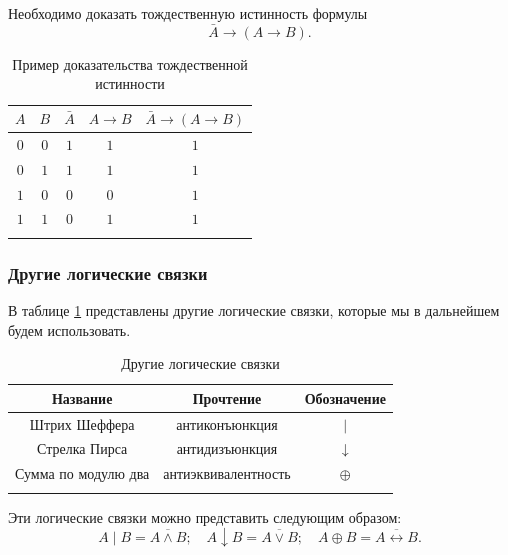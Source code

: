 \begin{example*}
    Необходимо доказать тождественную истинность формулы
    \[
        \bar{A} \to (A \to B).
    \]

    {
    \renewcommand*{\arraystretch}{1.5}
    \begin{longtable}{|c|c|c|c|c|}
        \hline
        \(A\) & \(B\) & \(\bar{A}\) & \(A \to B\) & \(\bar{A} \to (A \to B)\) \\
        \hline
        \(0\) & \(0\) & \(1\)       & \(1\)       & \(1\)                     \\
        \hline
        \(0\) & \(1\) & \(1\)       & \(1\)       & \(1\)                     \\
        \hline
        \(1\) & \(0\) & \(0\)       & \(0\)       & \(1\)                     \\
        \hline
        \(1\) & \(1\) & \(0\)       & \(1\)       & \(1\)                     \\
        \hline
        \caption{Пример доказательства тождественной истинности}
    \end{longtable}
    }
\end{example*}

\subsubsection{Другие логические связки}

В таблице \ref{tab:other-logical-connectives} представлены другие логические связки, которые мы в дальнейшем будем использовать.

{
\renewcommand*{\arraystretch}{1.5}
\begin{longtable}{|c|c|c|}
    \hline
    \textbf{Название}   & \textbf{Прочтение}  & \textbf{Обозначение} \\
    \hline
    Штрих Шеффера       & антиконъюнкция      & \(|\)                \\
    \hline
    Стрелка Пирса       & антидизъюнкция      & \(\downarrow\)       \\
    \hline
    Сумма по модулю два & антиэквивалентность & \(\oplus\)           \\
    \hline
    \caption{Другие логические связки}
    \label{tab:other-logical-connectives}
\end{longtable}
}

Эти логические связки можно представить следующим образом:
\[
    A \mathop{|} B = \overline{A \land B};
    \quad
    A \downarrow B = \overline{A \lor B};
    \quad
    A \oplus B = \overline{A \leftrightarrow B}.
\]

